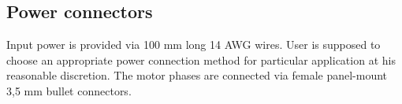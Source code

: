 \subsection{Power connectors}
Input power is provided via 100 mm long 14 AWG wires. User is supposed to choose an appropriate power
connection method for particular application at his reasonable discretion.
The motor phases are connected via female panel-mount 3,5 mm bullet connectors. 

\newpage

